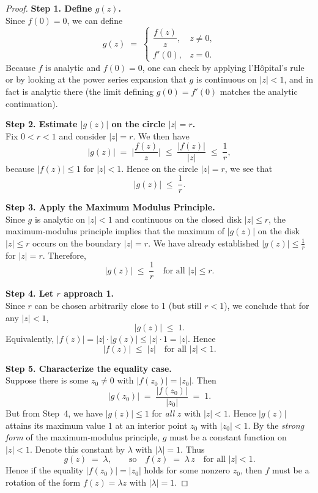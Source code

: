 \documentclass[12pt]{article}
\theoremstyle{definition} %
\theoremstyle{plain} %
\begin{document}
    \begin{proof}
    \textbf{Step 1. Define $g(z)$.}\\
    Since $f(0)=0$, we can define 
    \[
       g(z) \;=\;
       \begin{cases}
         \dfrac{f(z)}{z}, & z \neq 0, \\[6pt]
         f'(0), & z = 0.
       \end{cases}
    \]
    Because $f$ is analytic and $f(0) = 0$, one can check by applying l'H\^opital's rule or by looking
    at the power series expansion that $g$ is continuous on $|z|<1$, and in fact is analytic there (the
    limit defining $g(0) = f'(0)$ matches the analytic continuation).
    
    \medskip
    
    \noindent
    \textbf{Step 2. Estimate $|g(z)|$ on the circle $|z| = r$.}\\
    Fix $0 < r < 1$ and consider $|z|=r$.  We then have
    \[
       |g(z)| \;=\; \biggl|\frac{f(z)}{z}\biggr|
                \;\le\;\frac{|f(z)|}{|z|}
                \;\le\;\frac{1}{r},
    \]
    because $|f(z)| \le 1$ for $|z|<1$.  Hence on the circle $|z| = r$, we see that
    \[
      |g(z)| \;\le\;\frac{1}{r}.
    \]
    
    \medskip
    
    \noindent
    \textbf{Step 3. Apply the Maximum Modulus Principle.}\\
    Since $g$ is analytic on $|z|<1$ and continuous on the closed disk $|z|\le r$, the maximum‐modulus
    principle implies that the maximum of $|g(z)|$ on the disk $|z|\le r$ occurs on the boundary
    $|z|=r$.  We have already established $|g(z)| \le \frac{1}{r}$ for $|z|=r$.  Therefore,
    \[
      |g(z)| \;\le\;\frac{1}{r}
      \quad\text{for all } |z| \le r.
    \]
    
    \medskip
    
    \noindent
    \textbf{Step 4. Let $r$ approach 1.}\\
    Since $r$ can be chosen arbitrarily close to 1 (but still $r<1$), we conclude that for any
    $|z|<1$,
    \[
       |g(z)| \;\le\; 1.
    \]
    Equivalently, $|f(z)| = |z|\cdot|g(z)| \le |z|\cdot 1 = |z|$. 
    Hence
    \[
      |f(z)| \;\le\; |z|
      \quad\text{for all } |z|<1.
    \]
    
    \medskip
    
    \noindent
    \textbf{Step 5. Characterize the equality case.}\\
    Suppose there is some $z_0 \neq 0$ with $|f(z_0)| = |z_0|$.  Then 
    \[
       |g(z_0)| \;=\; \frac{|f(z_0)|}{|z_0|} \;=\; 1.
    \]
    But from Step~4, we have $|g(z)| \le 1$ for \emph{all} $z$ with $|z|<1$.  Hence $|g(z)|$ attains its
    maximum value $1$ at an interior point $z_0$ with $|z_0|<1$.  By the \emph{strong form} of the
    maximum‐modulus principle, $g$ must be a constant function on $|z|<1$.  Denote this constant by
    $\lambda$ with $|\lambda|=1$.  Thus
    \[
       g(z) \;=\; \lambda, 
       \qquad\text{so}\quad f(z) \;=\; \lambda \, z
       \quad\text{for all } |z|<1.
    \]
    Hence if the equality $|f(z_0)| = |z_0|$ holds for some nonzero $z_0$, then $f$ must be a rotation
    of the form $f(z) = \lambda z$ with $|\lambda|=1$.
    

\end{proof}
\end{document}
